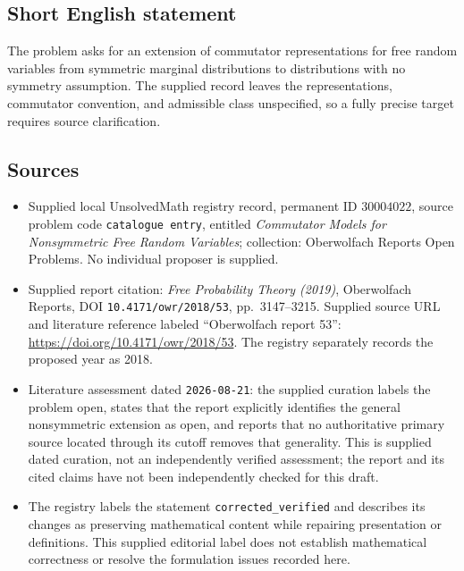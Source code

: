 \documentclass[11pt]{article}
\begin{document}
\subsection{Short English statement}
The problem asks for an extension of commutator representations for free random variables from symmetric marginal distributions to distributions with no symmetry assumption. The supplied record leaves the representations, commutator convention, and admissible class unspecified, so a fully precise target requires source clarification.
\subsection{Sources}
\begin{itemize}
\item Supplied local UnsolvedMath registry record, permanent ID \(30004022\), source problem code \texttt{catalogue entry}, entitled \emph{Commutator Models for Nonsymmetric Free Random Variables}; collection: Oberwolfach Reports Open Problems. No individual proposer is supplied.
\item Supplied report citation: \emph{Free Probability Theory (2019)}, Oberwolfach Reports, DOI \texttt{10.4171/owr/2018/53}, pp.~3147--3215. Supplied source URL and literature reference labeled ``Oberwolfach report 53'': \url{https://doi.org/10.4171/owr/2018/53}. The registry separately records the proposed year as 2018.
\item Literature assessment dated \texttt{2026-08-21}: the supplied curation labels the problem open, states that the report explicitly identifies the general nonsymmetric extension as open, and reports that no authoritative primary source located through its cutoff removes that generality. This is supplied dated curation, not an independently verified assessment; the report and its cited claims have not been independently checked for this draft.
\item The registry labels the statement \texttt{corrected\_verified} and describes its changes as preserving mathematical content while repairing presentation or definitions. This supplied editorial label does not establish mathematical correctness or resolve the formulation issues recorded here.
\end{itemize}
\end{document}
